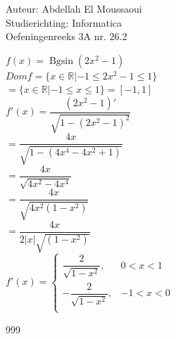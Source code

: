 \documentclass[a4paper]{article}
\begin{document}
  
\noindent \large Auteur: Abdellah El Moussaoui \\
\noindent \large Studierichting: Informatica\\
\noindent \large Oefeningenreeks 3A nr. 26.2\\

\medskip

\normalsize

$f(x)=\operatorname{Bgsin}\left(2x^2-1\right)$\\

$Domf=\{x\in \mathbb{R} | -1\leq2x^2-1\leq1\}$\\

$=\{x\in \mathbb{R} | -1\leq x\leq1\} = [-1,1]$\\

$f'(x)=\dfrac{\left(2x^2-1\right)'}{\sqrt{1-\left(2x^2-1\right)^2}}$\\

$=\dfrac{4x}{\sqrt{1-\left(4x^4-4x^2+1\right)}}$\\

$=\dfrac{4x}{\sqrt{4x^2-4x^4}}$\\

$=\dfrac{4x}{\sqrt{4x^2\left(1-x^2\right)}}$\\

$=\dfrac{4x}{2|x|\sqrt{\left(1-x^2\right)}}$\\

$f'(x)=\begin{cases}
\dfrac{2}{\sqrt{1-x^2}}, & 0<x<1\\
-\dfrac{2}{\sqrt{1-x^2}}, & -1<x<0\\
\end{cases}$

\begin{thebibliography}{999}
\end{thebibliography}
\end{document}
